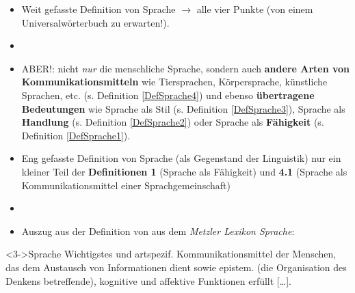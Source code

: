 \begin{frame}
		
\begin{itemize}
	\item<1-> Weit gefasste Definition von Sprache $\rightarrow$ alle vier Punkte (von einem Universalwörterbuch zu erwarten!).
	\item[]
	\item<2-> ABER!: nicht \textit{nur} die menschliche Sprache, sondern auch \textbf{andere Arten von Kommunikationsmitteln} wie Tiersprachen, Körpersprache, künstliche Sprachen, etc. (s. Definition \ref{DefSprache4}) und ebenso \textbf{übertragene Bedeutungen} wie Sprache als Stil (s. Definition 	\ref{DefSprache3}), Sprache als \textbf{Handlung} (s. Definition \ref{DefSprache2}) oder Sprache als \textbf{Fähigkeit} (s. Definition \ref{DefSprache1}).
\end{itemize}
		
\end{frame}



\begin{frame}

\begin{itemize}
	\item<1-> Eng gefasste Definition von Sprache (als Gegenstand der Linguistik) \ras nur ein kleiner Teil der \textbf{Definitionen 1} (Sprache als Fähigkeit) und \textbf{4.1} (Sprache als Kommunikationsmittel einer Sprachgemeinschaft)
	\item[]
	\item<2-> Auszug aus der Definition von  aus dem \textit{Metzler Lexikon Sprache}:
\end{itemize}
			
\begin{block}<3->{Sprache}
    	   Wichtigstes und artspezif. Kommunikationsmittel der Menschen, das dem Austausch von Informationen dient sowie epistem. (die Organisation des Denkens betreffende), kognitive und affektive Funktionen erfüllt {[}\dots]. \citep{Glueck00a}
\end{block}
	
\end{frame}


